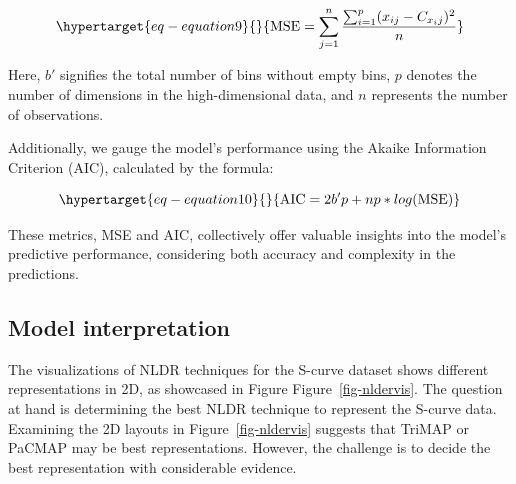 \documentclass[
  12pt]{article}
\begin{document}
\begin{equation}\protect\hypertarget{eq-equation9}{}{
\text{MSE} = \sum_{j = 1}^{n} \frac{\sum_{i = 1}^{p} (x_{ij} - C_{x_ij})^2}{n}
}\label{eq-equation9}\end{equation}

Here, \(b'\) signifies the total number of bins without empty bins,
\(p\) denotes the number of dimensions in the high-dimensional data, and
\(n\) represents the number of observations.

Additionally, we gauge the model's performance using the Akaike
Information Criterion (AIC), calculated by the formula:

\begin{equation}\protect\hypertarget{eq-equation10}{}{
\text{AIC} = 2b'p + np * log(\text{MSE})
}\label{eq-equation10}\end{equation}

These metrics, MSE and AIC, collectively offer valuable insights into
the model's predictive performance, considering both accuracy and
complexity in the predictions.

\hypertarget{model-interpretation}{%
\subsection{Model interpretation}\label{model-interpretation}}

The visualizations of NLDR techniques for the S-curve dataset shows
different representations in 2D, as showcased in Figure
Figure~\ref{fig-nldervis}. The question at hand is determining the best
NLDR technique to represent the S-curve data. Examining the 2D layouts
in Figure~\ref{fig-nldervis} suggests that TriMAP or PaCMAP may be best
representations. However, the challenge is to decide the best
representation with considerable evidence.
\end{document}

